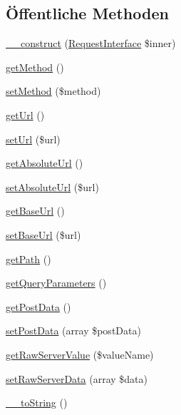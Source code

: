 \subsection*{Öffentliche Methoden}
\begin{DoxyCompactItemize}
\item 
\mbox{\hyperlink{class_sabre_1_1_h_t_t_p_1_1_request_decorator_ac403c648cdd078a700d33e442847a3bf}{\+\_\+\+\_\+construct}} (\mbox{\hyperlink{interface_sabre_1_1_h_t_t_p_1_1_request_interface}{Request\+Interface}} \$inner)
\item 
\mbox{\hyperlink{class_sabre_1_1_h_t_t_p_1_1_request_decorator_a696811a053a65fafc920dbdfde0bd545}{get\+Method}} ()
\item 
\mbox{\hyperlink{class_sabre_1_1_h_t_t_p_1_1_request_decorator_a585f5ca3ea04942eb78b14a16ec48d46}{set\+Method}} (\$method)
\item 
\mbox{\hyperlink{class_sabre_1_1_h_t_t_p_1_1_request_decorator_a7d8a661f5bc1d045b4d1d9d315ff6aae}{get\+Url}} ()
\item 
\mbox{\hyperlink{class_sabre_1_1_h_t_t_p_1_1_request_decorator_a7cb8a935719f2e497d30a8aabdef58b2}{set\+Url}} (\$url)
\item 
\mbox{\hyperlink{class_sabre_1_1_h_t_t_p_1_1_request_decorator_a5534f8c39e2618f40c5c1ff41c44a5ab}{get\+Absolute\+Url}} ()
\item 
\mbox{\hyperlink{class_sabre_1_1_h_t_t_p_1_1_request_decorator_ad3a68a47dd02e6e338ce03dac1dc409a}{set\+Absolute\+Url}} (\$url)
\item 
\mbox{\hyperlink{class_sabre_1_1_h_t_t_p_1_1_request_decorator_ae083a7f3c8138b06e8beae5dfca6fd92}{get\+Base\+Url}} ()
\item 
\mbox{\hyperlink{class_sabre_1_1_h_t_t_p_1_1_request_decorator_ade9d2cb79ced7689675d480ffe5cf781}{set\+Base\+Url}} (\$url)
\item 
\mbox{\hyperlink{class_sabre_1_1_h_t_t_p_1_1_request_decorator_a4349070826f60655b60ea18a61dc8c3c}{get\+Path}} ()
\item 
\mbox{\hyperlink{class_sabre_1_1_h_t_t_p_1_1_request_decorator_a53b080a564c253e8eb531c6d3bc193c8}{get\+Query\+Parameters}} ()
\item 
\mbox{\hyperlink{class_sabre_1_1_h_t_t_p_1_1_request_decorator_ac11069037a0860cdcdf128ee9ba307fb}{get\+Post\+Data}} ()
\item 
\mbox{\hyperlink{class_sabre_1_1_h_t_t_p_1_1_request_decorator_ac355c936a5f6baddd65c55f8d5d81032}{set\+Post\+Data}} (array \$post\+Data)
\item 
\mbox{\hyperlink{class_sabre_1_1_h_t_t_p_1_1_request_decorator_a9e7d4fb06d30561c0bcf256a897afdaf}{get\+Raw\+Server\+Value}} (\$value\+Name)
\item 
\mbox{\hyperlink{class_sabre_1_1_h_t_t_p_1_1_request_decorator_acaa7bf6e2566bd2c554dc8f589c93f51}{set\+Raw\+Server\+Data}} (array \$data)
\item 
\mbox{\hyperlink{class_sabre_1_1_h_t_t_p_1_1_request_decorator_a95698fd1b0719895d4db58964832dd06}{\+\_\+\+\_\+to\+String}} ()
\end{DoxyCompactItemize}


